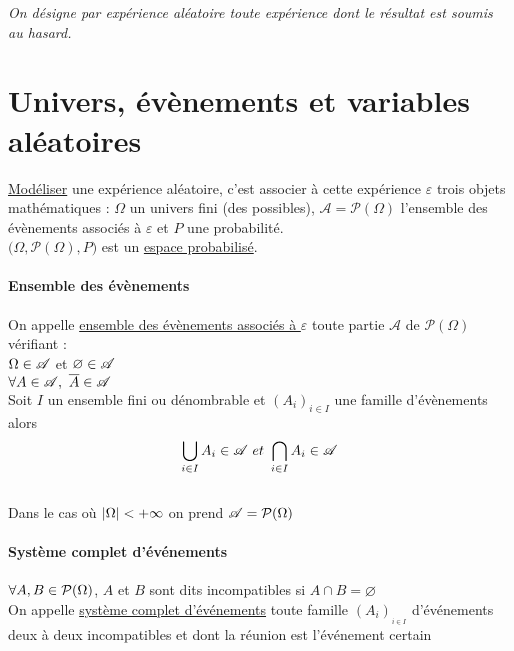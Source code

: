

\textsl{On désigne par expérience aléatoire toute expérience dont le résultat est soumis au hasard.}
\minitoc
	\section{Univers, évènements et variables aléatoires}
		\uline{Modéliser} une expérience aléatoire, c'est associer à cette expérience $\varepsilon$ trois objets mathématiques : $\Omega$ un univers fini (des possibles), $\mathscr{A} = \mathcal{P}(\Omega)$ l'ensemble des évènements associés à $\varepsilon$ et $P$ une probabilité.\\ \hspace*{0.5cm}
		$\big(\Omega ,\mathcal{P}(\Omega),P\big)$ est un \uline{espace probabilisé}.
		\traitd
		\paragraph{Ensemble des évènements}
			On appelle \uline{ensemble des évènements associés à $\varepsilon$} toute partie $\mathscr{A}$ de $\mathcal{P}(\Omega)$ vérifiant :\\
			\hspace*{2cm} \un $\Omega\in {\mathscr{A}}$ et $\varnothing\in{\mathscr{A}}$\\
			\hspace*{2cm} \deux $\forall A\in{\mathscr{A}} ,~ \overline{A}\in{\mathscr{A}}$\\
			\hspace*{2cm} \trois Soit $I$ un ensemble fini ou dénombrable et $(A_i)_{i\in I}$ une famille d'évènements alors 
			\[ \bigcup_{i\in I} A_i \in {\mathscr{A}} ~et~ \bigcap_{i\in I} A_i \in {\mathscr{A}} \]
			\trait \vspace*{-1.2cm} \\
			Dans le cas où $\left\vert \Omega \right\vert < +\infty$ on prend ${\mathscr{A}} =\mathcal{P}(\Omega)$ \\ \traitd
		\paragraph{Système complet d'événements}
			${}$ \\ \hspace*{2cm} \un $\forall A,B\in \mathcal{P}(\Omega)$, $A$ et $B$ sont dits incompatibles si $A\cap B = \varnothing$ \\
			\hspace*{2cm} \deux On appelle \uline{système complet d'événements} toute famille $(A_i)_{_{i\in I}}$ d'événements deux à deux incompatibles et dont la réunion est l'événement certain \trait ${}$ \vspace*{-1.3cm} \traitd
